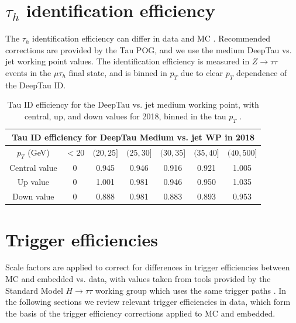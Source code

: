 \section{$\tau_{h}$ identification efficiency}
The $\tau_{h}$ identification efficiency can differ in data and MC \cite{twiki_TAU_POG_tauidrecommendationforrun2}. Recommended corrections are provided by the Tau POG, and we use the medium DeepTau vs. jet working point values. The identification efficiency is measured in $Z \rightarrow \tau\tau$ events in the $\mu\tau_{h}$ final state, and is binned in $p_{T}$ due to clear $p_{T}$ dependence of the DeepTau ID. 


\begin{table}[h]
    \centering
    \begin{tabular}{|c|c|c|c|c|c|c|}
    \hline
    \multicolumn{7}{|c|}{Tau ID efficiency for DeepTau Medium vs. jet WP in 2018}                                   \\ \hline
    \hline
    $p_{T}$ (GeV)  & $<20$  & $(20, 25]$ & $(25, 30]$ & $(30, 35]$ & $(35, 40]$ & $(40, 500] $   \\ \hline
    Central value  & 0      & 0.945      & 0.946      & 0.916      & 0.921      & 1.005 \\
    Up value       & 0      & 1.001      & 0.981      & 0.946      & 0.950      & 1.035 \\
    Down value     & 0      & 0.888      & 0.981      & 0.883      & 0.893      & 0.953 \\ \hline
    \end{tabular}
    \caption[Tau ID efficiency for the DeepTau vs. jet medium working point, with central, up, and down values for 2018, binned in the tau $p_{T}$.]{Tau ID efficiency for the DeepTau vs. jet medium working point, with central, up, and down values for 2018, binned in the tau $p_{T}$ \cite{twiki_TAU_POG_tauidrecommendationforrun2}.}
    \label{table:tauIDeff_deepTau_vs_jet_medium_WP}
\end{table}


\section{Trigger efficiencies}

Scale factors are applied to correct for differences in trigger efficiencies between MC and embedded vs. data, with values taken from tools provided by the Standard Model $H \rightarrow \tau\tau$ working group which uses the same trigger paths \cite{twiki_HiggsToTauTauWorkingLegacyRun2}. In the following sections we review relevant trigger efficiencies in data, which form the basis of the trigger efficiency corrections applied to MC and embedded.

